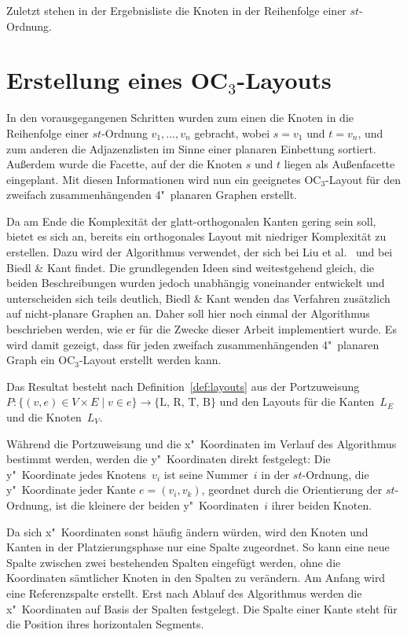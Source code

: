 \documentclass[a4paper]{scrreprt}
\theoremstyle{definition}
\begin{document}
Zuletzt stehen in der Ergebnisliste die Knoten in der Reihenfolge einer $st$-Ordnung.

\section{Erstellung eines OC$_3$-Layouts}
\label{sec:oc3algo}

In den vorausgegangenen Schritten wurden zum einen die Knoten in die Reihenfolge einer $st$-Ordnung $v_1, \dots, v_n$ gebracht, wobei $s = v_1$ und $t = v_n$, und zum anderen die Adjazenzlisten im Sinne einer planaren Einbettung sortiert. Außerdem wurde die Facette, auf der die Knoten $s$ und $t$ liegen als Außenfacette eingeplant. Mit diesen Informationen wird nun ein geeignetes OC$_3$-Layout für den zweifach zusammenhängenden 4"~planaren Graphen erstellt. 

Da am Ende die Komplexität der glatt-orthogonalen Kanten gering sein soll, bietet es sich an, bereits ein orthogonales Layout mit niedriger Komplexität zu erstellen. Dazu wird der Algorithmus verwendet, der sich bei Liu et al.~\cite{liu+etal-98} und bei Biedl \& Kant \cite{biedl+kant-98} findet. Die grundlegenden Ideen sind weitestgehend gleich, die beiden Beschreibungen wurden jedoch unabhängig voneinander entwickelt und unterscheiden sich teils deutlich, Biedl \& Kant wenden das Verfahren zusätzlich auf nicht-planare Graphen an. Daher soll hier noch einmal der Algorithmus beschrieben werden, wie er für die Zwecke dieser Arbeit implementiert wurde. Es wird damit gezeigt, dass für jeden zweifach zusammenhängenden 4"~planaren Graph ein OC$_3$-Layout erstellt werden kann.

Das Resultat besteht nach Definition~\ref{def:layouts} aus der Portzuweisung $P: \{(v, e) \in V \times E \mid v \in e\} \to \{\text{L, R, T, B}\}$ und den Layouts für die Kanten~$L_E$ und die Knoten~$L_V$.

Während die Portzuweisung und die x"~Koordinaten im Verlauf des Algorithmus bestimmt werden, werden die y"~Koordinaten direkt festgelegt: Die y"~Koordinate jedes Knotens~$v_i$ ist seine Nummer~$i$ in der $st$-Ordnung, die y"~Koordinate jeder Kante $e = (v_i, v_k)$, geordnet durch die Orientierung der $st$-Ordnung, ist die kleinere der beiden y"~Koordinaten~$i$ ihrer beiden Knoten.

Da sich x"~Koordinaten sonst häufig ändern würden, wird den Knoten und Kanten in der Platzierungsphase nur eine Spalte zugeordnet. So kann eine neue Spalte zwischen zwei bestehenden Spalten eingefügt werden, ohne die Koordinaten sämtlicher Knoten in den Spalten zu verändern. Am Anfang wird eine Referenzspalte erstellt. Erst nach Ablauf des Algorithmus werden die x"~Koordinaten auf Basis der Spalten festgelegt. Die Spalte einer Kante steht für die Position ihres horizontalen Segments.
\end{document}
